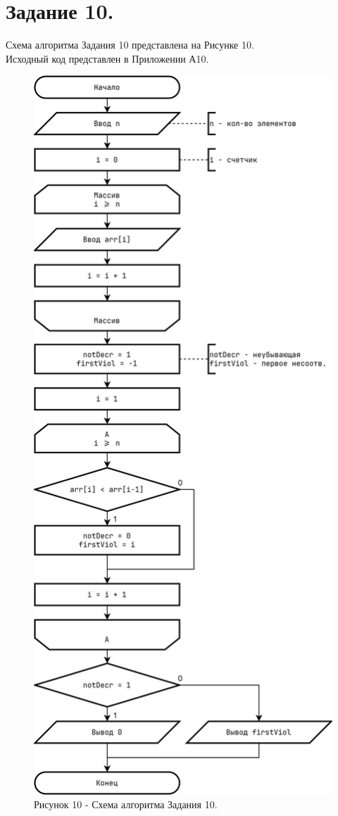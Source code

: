 \documentclass[oneside,a4paper,14pt]{extarticle}
\begin{document}
\section*{Задание 10.}
\noindent Схема алгоритма Задания 10 представлена на Рисунке 10.\\
\noindent Исходный код представлен в Приложении А10. \\
\begin{figure}[!ht]
	\centering
	\includegraphics[height=0.75\textheight]{pics/flowchart-22.png}
	\caption*{Рисунок 10 - Схема алгоритма Задания 10.}
\end{figure}
\end{document}
